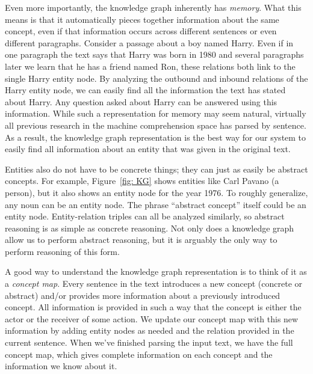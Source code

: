 \documentclass[pageno]{final_paper}
\begin{document}
Even more importantly, the knowledge graph inherently has \textit{memory}. What
this means is that it automatically pieces together information about the same
concept, even if that information occurs across different sentences or even
different paragraphs. Consider a passage about a boy named Harry. Even if in one
paragraph the text says that Harry was born in 1980 and several paragraphs later
we learn that he has a friend named Ron, these relations both link to the single
Harry entity node. By analyzing the outbound and inbound relations of the Harry
entity node, we can easily find all the information the text has stated about
Harry. Any question asked about Harry can be answered using this information.
While such a representation for memory may seem natural, virtually all previous
research in the machine comprehension space has parsed by sentence. As a result,
the knowledge graph representation is the best way for our system to easily find
all information about an entity that was given in the original text.

Entities also do not have to be concrete things; they can just as easily be
abstract concepts. For example, Figure~\ref{fig: KG} shows entities like Carl
Pavano (a person), but it also shows an entity node for the year 1976. To
roughly generalize, any noun can be an entity node. The phrase ``abstract
concept'' itself could be an entity node. Entity-relation triples can all be
analyzed similarly, so abstract reasoning is as simple as concrete reasoning.
Not only does a knowledge graph allow us to perform abstract reasoning, but it
is arguably the only way to perform reasoning of this form.

A good way to understand the knowledge graph representation is to think of it as
a \textit{concept map}. Every sentence in the text introduces a new concept
(concrete or abstract) and/or provides more information about a previously
introduced concept. All information is provided in such a way that the concept
is either the actor or the receiver of some action. We update our concept map
with this new information by adding entity nodes as needed and the relation
provided in the current sentence. When we've finished parsing the input text,
we have the full concept map, which gives complete information on each concept
and the information we know about it.
\end{document}
